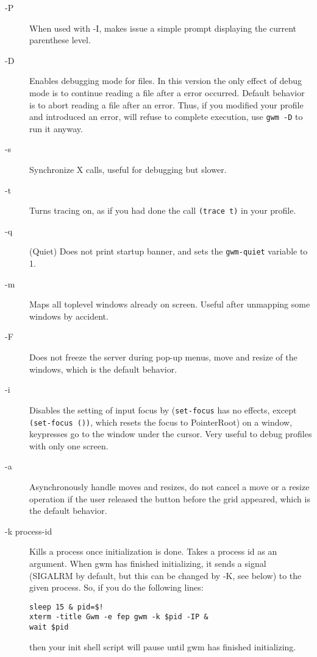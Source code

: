 \begin{description}
\item[-P] When used with -I, makes {\GWM} issue a simple prompt displaying the
current parenthese level.

\item[-D] Enables debugging mode for {\WOOL} files. In this version the only
effect of debug mode is to continue reading a file after a {\WOOL}
error occurred. Default behavior is to abort reading a file after an error.
Thus, if you modified your profile and introduced an error, {\GWM} will
refuse to complete execution, use {\tt gwm -D} to run it anyway.

\item[-s] Synchronize X calls, useful for debugging but slower.

\item[-t] Turns tracing on, as if you had done the call \verb"(trace t)" in
your profile.

\item[-q] (Quiet) Does not print startup banner, and sets the {\WOOL}
\verb"gwm-quiet" variable to 1.

\item[-m] Maps all toplevel windows already on screen. Useful after
unmapping some windows by accident.

\item[-F] Does not freeze the server during pop-up menus, move and resize of
the windows, which is the default behavior.

\item[-i] Disables the setting of input focus by {\GWM} (\verb"set-focus"
has no effects, except \verb"(set-focus ())", which resets the focus to
PointerRoot) on a window, keypresses go to the window under the cursor. Very
useful to debug profiles with only one screen.

\item[-a] Asynchronously handle moves and resizes, do not cancel a
move or a resize operation if the user released the button before the grid
appeared, which is the default behavior.

\item[-k process-id]
Kills a process once initialization is done. Takes a process id as an
argument. When gwm has finished initializing, it sends a signal (SIGALRM
by default, but this can be changed by -K, see below) to the given process. 
So, if you do the following lines:
\begin{verbatim} 
sleep 15 & pid=$!
xterm -title Gwm -e fep gwm -k $pid -IP &
wait $pid
\end{verbatim}
then your init shell script will pause until gwm has finished initializing.


\end{description}
